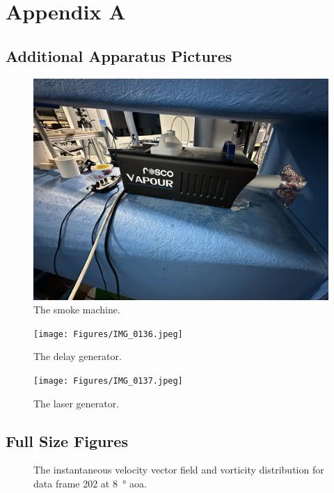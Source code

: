 \chapter{Appendix A} \label{cp:figures}

\section{Additional Apparatus Pictures} \label{sec:additional_apparatus}

\begin{figure}[htpb]
    \centering
    \includegraphics[width=\linewidth]{Figures/IMG_0135.jpeg}
    \caption{The smoke machine.}
    \label{fig:smoke_machine}
\end{figure}

\begin{figure}[htpb]
    \centering
    \texttt{[image: Figures/IMG\_0136.jpeg]}
    \caption{The delay generator.}
    \label{fig:delay_generator}
\end{figure}

\begin{figure}[htpb]
    \centering
    \texttt{[image: Figures/IMG\_0137.jpeg]}
    \caption{The laser generator.}
    \label{fig:laser_generator}
\end{figure}

\newpage
\section{Full Size Figures} \label{sec:full_size_figures}

\begin{figure}[htpb]
    \centering
    
    \caption{The instantaneous velocity vector field and vorticity distribution for data frame \num{202} at \qty{8}{\degree} \acrshort{aoa}.}
    \label{fig:full_instant_aoa8}
\end{figure}

